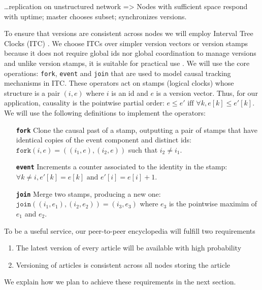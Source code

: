\documentclass{article}
\begin{document}
…replication on unstructured network => Nodes with sufficient space respond with uptime; master chooses subset; synchronizes versions.

To ensure that versions are consistent across nodes we will employ Interval Tree
Clocks (ITC) \cite{abf08}. We choose ITCs over simpler version vectors \cite{ppr83}
or version stamps \cite{abf02} because it does not require global ids nor global
coordination to manage versions and unlike version stamps, it is suitable for
practical use \cite{abf07}. We will use the core operations: \texttt{fork},
\texttt{event} and \texttt{join} that are used to model causal tracking mechanisms
in ITC. These operators act on stamps (logical clocks) whose structure is a pair
$(i,e)$ where $i$ is an id and $e$ is a version vector. Thus, for our application,
causality is the pointwise partial order: $e \leq e' \textrm{ iff } \forall{k}, e[k] \leq e'[k]$.
We will use the following definitions to implement the operators:

\begin{itemize}
  \item[\textbf{\texttt{fork}}] Clone the causal past of a stamp, outputting a pair of stamps that
  have identical copies of the event component and distinct ids:
  $\texttt{fork}(i,e) = \left((i_{1},e),(i_{2},e)\right)$ such that $i_{2} \ne i_{1}$.

  \item[\textbf{\texttt{event}}] Increments a counter associated to the identity in the stamp:
  $\forall{k} \ne i, e'[k] = e[k] \textrm{ and } e'[i] = e[i] + 1$.

  \item[\textbf{\texttt{join}}] Merge two stamps, producing a new one:
  $\texttt{join}\left((i_{1},e_{1}),(i_{2},e_{2})\right) = (i_{3},e_{3})$ where $e_{3}$
  is the pointwise maximim of $e_{1}$ and $e_{2}$.
\end{itemize}

\noindent
To be a useful service, our peer-to-peer encyclopedia will fulfill two requirements
\begin{enumerate}[
  labelindent=\parindent,
  style=multiline,
  leftmargin=*,
  label=(SG\arabic*)
]
  \item The latest version of every article will be available with high probability
  \item Versioning of articles is consistent across all nodes storing the article
\end{enumerate}

\noindent
We explain how we plan to achieve these requirements in the next section.
\end{document}
